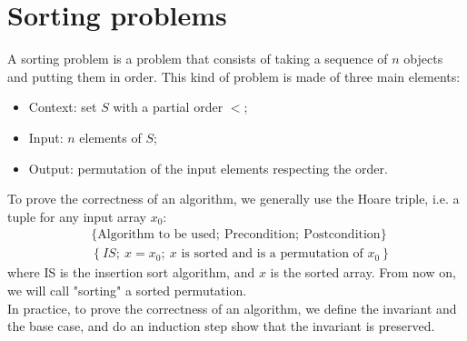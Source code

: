 \documentclass[12pt, openany]{report}
\theoremstyle{definition}
\begin{document}
\section{Sorting problems}
A sorting problem is a problem that consists of taking a sequence of $n$ objects and putting them in order. This kind of problem is made of three main elements:
\begin{itemize}
  \item Context: set $S$ with a partial order $<$;
  \item Input: $n$ elements of $S$;
  \item Output: permutation of the input elements respecting the order.
\end{itemize}
To prove the correctness of an algorithm, we generally use the Hoare triple, i.e. a tuple for any input array $x_0$:
\begin{equation}
  \begin{aligned}
	&\{\text{Algorithm to be used};\ \text{Precondition}; \ \text{Postcondition}\}\\
	&\left\{IS;\ x=x_0;\ x\text{ is sorted and is a permutation of }x_0\right\}
\end{aligned}
\end{equation}
where IS is the insertion sort algorithm, and $x$ is the sorted array. From now on, we will call "sorting" a sorted permutation. \\
In practice, to prove the correctness of an algorithm, we define the invariant and the base case, and do an induction step show that the invariant is preserved.\\
\end{document}
